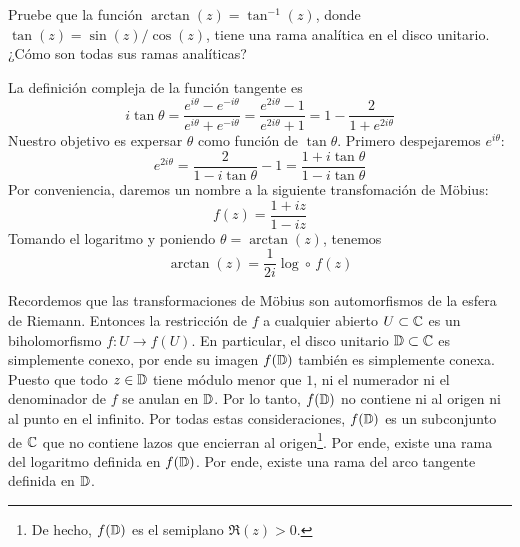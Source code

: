 \begin{exercise}
Pruebe que la función $\arctan(z) = \tan^{-1}(z)$, donde $\tan(z) = \sin(z) / \cos(z)$, tiene una rama analítica en el disco unitario. ¿Cómo son todas sus ramas analíticas?
\end{exercise}

\begin{solution}
La definición compleja de la función tangente es
$$
i \tan \theta
    = \frac {e^{i\theta} - e^{-i\theta}} {e^{i\theta} + e^{-i\theta}}
    = \frac {e^{2i\theta} - 1} {e^{2i\theta} + 1}
    = 1 - \frac 2 {1 + e^{2i\theta}}
$$
Nuestro objetivo es expersar $\theta$ como función de $\tan \theta$. Primero despejaremos $e^{i\theta}$:
$$
e^{2i\theta}
    = \frac 2 {1 - i \tan \theta} - 1
    = \frac {1 + i \tan \theta} {1 - i \tan \theta}
$$
Por conveniencia, daremos un nombre a la siguiente transfomación de Möbius:
$$f(z) = \frac {1 + iz} {1 - iz}$$
Tomando el logaritmo y poniendo $\theta = \arctan(z)$, tenemos
$$\arctan(z) = \frac 1 {2i} \log \circ \, f(z)$$

Recordemos que las transformaciones de Möbius son automorfismos de la esfera de Riemann. Entonces la restricción de $f$ a cualquier abierto $U \subset \mathbb C$ es un biholomorfismo $f : U \to f(U)$. En particular, el disco unitario $\mathbb D \subset \mathbb C$ es simplemente conexo, por ende su imagen $f(\mathbb D)$ también es simplemente conexa. Puesto que todo $z \in \mathbb D$ tiene módulo menor que $1$, ni el numerador ni el denominador de $f$ se anulan en $\mathbb D$. Por lo tanto, $f(\mathbb D)$ no contiene ni al origen ni al punto en el infinito. Por todas estas consideraciones, $f(\mathbb D)$ es un subconjunto de $\mathbb C$ que no contiene lazos que encierran al origen\footnote{De hecho, $f(\mathbb D)$ es el semiplano $\Re(z) > 0$.}. Por ende, existe una rama del logaritmo definida en $f(\mathbb D)$. Por ende, existe una rama del arco tangente definida en $\mathbb D$.
\end{solution}
